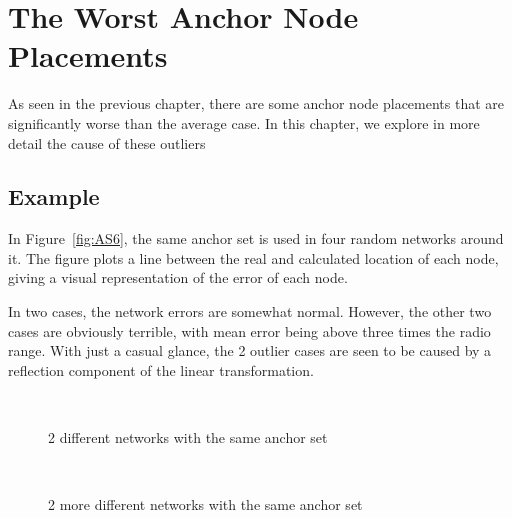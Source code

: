 \chapter{The Worst Anchor Node Placements}
As seen in the previous chapter, there are some anchor node placements that are significantly worse than the average case.   In this chapter, we explore in more detail the cause of these outliers

\section{Example}

In Figure~\ref{fig:AS6}, the same anchor set is used in four random networks around it.  The figure plots a line between the real and calculated location of each node, giving a visual representation of the error of each node.  

In two cases, the network errors are somewhat normal.  However, the other two cases are obviously terrible, with mean error being above three times the radio range.  With just a casual glance, the 2 outlier cases are seen to be caused by a reflection component of the linear transformation.  
\begin{figure}
  \centering
	\\
	\caption{2 different networks with the same anchor set}	
	\label{fig:AS6bad}		
\end{figure}
\begin{figure}
  \centering
	\\
	\caption{2 more different networks with the same anchor set}	
	\label{fig:AS6bad}
\end{figure}
